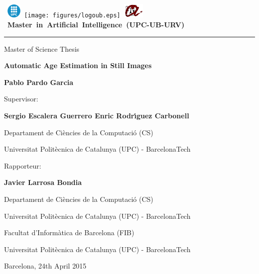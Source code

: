 \thispagestyle{empty}
\vspace*{-2cm}

\hbox{
\includegraphics[width=0.7cm]{figures/logoupc.eps}
\texttt{[image: figures/logoub.eps]}
\includegraphics[width=1cm]{figures/logourv.eps}
\Large \bf Master in Artificial Intelligence (UPC-UB-URV)}
\hrule

\bigskip\bigskip\bigskip

\begin{center}

{\LARGE Master of Science Thesis}

\bigskip\bigskip\bigskip\bigskip\bigskip

\textbf{\huge \bf Automatic Age Estimation in Still Images}

\bigskip\bigskip\bigskip\bigskip\bigskip

{\LARGE \bf Pablo Pardo Garcia}

\vspace*{5cm}

{\large Supervisor:}

\medskip\medskip\smallskip

{\Large\bf Sergio Escalera Guerrero \qquad Enric Rodr{\'\i}guez Carbonell}

\medskip\medskip

{\Large Departament de Ci{\`e}ncies de la Computaci{\'o} (CS)}

\medskip

{\Large Universitat Polit{\`e}cnica de Catalunya (UPC) - BarcelonaTech}


\bigskip\bigskip\bigskip

{\large Rapporteur:}

\medskip\medskip\smallskip

{\Large\bf Javier Larrosa Bondia}

\medskip\medskip

{\Large Departament de Ci{\`e}ncies de la Computaci{\'o} (CS)}

\medskip

{\Large Universitat Polit{\`e}cnica de Catalunya (UPC) - BarcelonaTech}

\bigskip\bigskip\bigskip\bigskip\bigskip

{\Large Facultat d'Inform{\`a}tica de Barcelona (FIB)}

\medskip

{\Large Universitat Polit{\`e}cnica de Catalunya (UPC) - BarcelonaTech}

\medskip\medskip\medskip\medskip\medskip

{\Large Barcelona, 24th April 2015}

\end{center}

\clearpage

\thispagestyle{empty}
\ 
\clearpage
